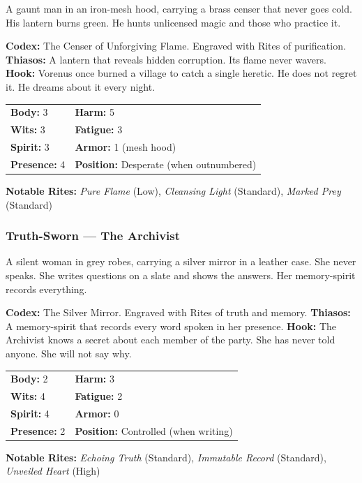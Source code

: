 A gaunt man in an iron-mesh hood, carrying a brass censer that never goes cold. His lantern burns green. He hunts unlicensed magic and those who practice it.

\textbf{Codex:} The Censer of Unforgiving Flame. Engraved with Rites of purification.
\textbf{Thiasos:} A lantern that reveals hidden corruption. Its flame never wavers.
\textbf{Hook:} Vorenus once burned a village to catch a single heretic. He does not regret it. He dreams about it every night.

\begin{tabular}{ll}
\textbf{Body:} 3 & \textbf{Harm:} 5 \\
\textbf{Wits:} 3 & \textbf{Fatigue:} 3 \\
\textbf{Spirit:} 3 & \textbf{Armor:} 1 (mesh hood) \\
\textbf{Presence:} 4 & \textbf{Position:} Desperate (when outnumbered) \\
\end{tabular}

\textbf{Notable Rites:} \textit{Pure Flame} (Low), \textit{Cleansing Light} (Standard), \textit{Marked Prey} (Standard)

\subsubsection{Truth-Sworn — The Archivist}

A silent woman in grey robes, carrying a silver mirror in a leather case. She never speaks. She writes questions on a slate and shows the answers. Her memory-spirit records everything.

\textbf{Codex:} The Silver Mirror. Engraved with Rites of truth and memory.
\textbf{Thiasos:} A memory-spirit that records every word spoken in her presence.
\textbf{Hook:} The Archivist knows a secret about each member of the party. She has never told anyone. She will not say why.

\begin{tabular}{ll}
\textbf{Body:} 2 & \textbf{Harm:} 3 \\
\textbf{Wits:} 4 & \textbf{Fatigue:} 2 \\
\textbf{Spirit:} 4 & \textbf{Armor:} 0 \\
\textbf{Presence:} 2 & \textbf{Position:} Controlled (when writing) \\
\end{tabular}

\textbf{Notable Rites:} \textit{Echoing Truth} (Standard), \textit{Immutable Record} (Standard), \textit{Unveiled Heart} (High)

